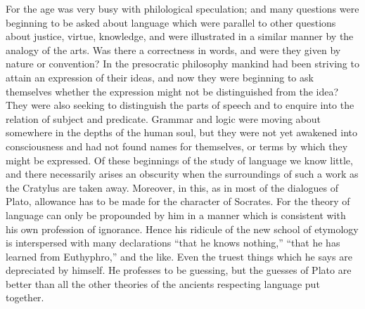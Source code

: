 \documentclass[11pt,letter]{article}
\begin{document}
\par  For the age was very busy with philological speculation; and many questions were beginning to be asked about language which were parallel to other questions about justice, virtue, knowledge, and were illustrated in a similar manner by the analogy of the arts. Was there a correctness in words, and were they given by nature or convention? In the presocratic philosophy mankind had been striving to attain an expression of their ideas, and now they were beginning to ask themselves whether the expression might not be distinguished from the idea? They were also seeking to distinguish the parts of speech and to enquire into the relation of subject and predicate. Grammar and logic were moving about somewhere in the depths of the human soul, but they were not yet awakened into consciousness and had not found names for themselves, or terms by which they might be expressed. Of these beginnings of the study of language we know little, and there necessarily arises an obscurity when the surroundings of such a work as the Cratylus are taken away. Moreover, in this, as in most of the dialogues of Plato, allowance has to be made for the character of Socrates. For the theory of language can only be propounded by him in a manner which is consistent with his own profession of ignorance. Hence his ridicule of the new school of etymology is interspersed with many declarations “that he knows nothing,” “that he has learned from Euthyphro,” and the like. Even the truest things which he says are depreciated by himself. He professes to be guessing, but the guesses of Plato are better than all the other theories of the ancients respecting language put together.
\end{document}
